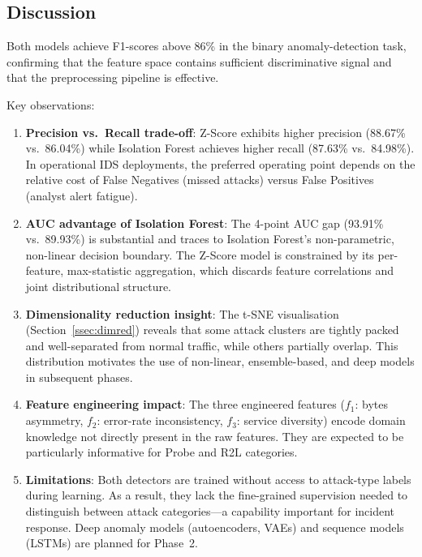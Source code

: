 \documentclass[conference]{IEEEtran}
\begin{document}
\subsection{Discussion}
\label{ssec:discussion}

Both models achieve F1-scores above 86\% in the binary anomaly-detection task,
confirming that the feature space contains sufficient discriminative signal and
that the preprocessing pipeline is effective.

Key observations:
\begin{enumerate}
  \item \textbf{Precision vs.\ Recall trade-off}: Z-Score exhibits higher precision
        (88.67\% vs.\ 86.04\%) while Isolation Forest achieves higher recall (87.63\%
        vs.\ 84.98\%).  In operational IDS deployments, the preferred operating point
        depends on the relative cost of False Negatives (missed attacks) versus False
        Positives (analyst alert fatigue).

  \item \textbf{AUC advantage of Isolation Forest}: The 4-point AUC gap (93.91\%
        vs.\ 89.93\%) is substantial and traces to Isolation Forest's non-parametric,
        non-linear decision boundary.  The Z-Score model is constrained by its
        per-feature, max-statistic aggregation, which discards feature correlations
        and joint distributional structure.

  \item \textbf{Dimensionality reduction insight}: The t-SNE visualisation
        (Section~\ref{ssec:dimred}) reveals that some attack clusters are tightly
        packed and well-separated from normal traffic, while others partially overlap.
        This distribution motivates the use of non-linear, ensemble-based, and deep
        models in subsequent phases.

  \item \textbf{Feature engineering impact}: The three engineered features
        ($f_1$: bytes asymmetry, $f_2$: error-rate inconsistency, $f_3$: service
        diversity) encode domain knowledge not directly present in the raw features.
        They are expected to be particularly informative for Probe and R2L categories.

  \item \textbf{Limitations}: Both detectors are trained without access to
        attack-type labels during learning.  As a result, they lack the fine-grained
        supervision needed to distinguish between attack categories---a capability
        important for incident response.  Deep anomaly models (autoencoders, VAEs) and
        sequence models (LSTMs) are planned for Phase~2.
\end{enumerate}
\end{document}

